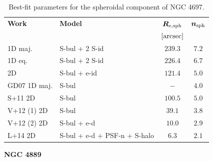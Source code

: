 \documentclass[preprint2]{emulateapj}
\begin{document}
  \begin{table}[h]
  \small
  \caption{Best-fit parameters for the spheroidal component of NGC 4697.}
  \begin{center}
  \begin{tabular}{llcc}
  \hline
  {\bf Work} & {\bf Model}   & $\bm R_{\rm e,sph}$    & $\bm n_{\rm sph}$ \\
    &  &  $[\rm arcsec]$ & \\
  \hline
  1D maj. & S-bul + 2 S-id & $239.3$  &  $7.2$ \\
  1D eq.  & S-bul + 2 S-id & $226.4$  &  $6.7$ \\
  2D      & S-bul + e-id	& $121.4$  &  $5.0$ \\
  \hline
  GD07 1D maj.  & S-bul & $-$  &  $4.0$ \\
  S+11 2D  & S-bul & $100.5$  &  $5.0$ \\
  V+12 (1) 2D  & S-bul & $39.1$  &  $3.8$ \\
  V+12 (2) 2D  & S-bul + e-d & $10.0$  &  $2.9$ \\
  L+14 2D  & S-bul + e-d + PSF-n + S-halo & $6.3$  &  $2.1$ \\
  \hline
  \end{tabular}
  \end{center}
  \label{tab:n4697}
  \end{table}

  \clearpage\newpage\noindent
  {\bf NGC 4889 \\}
\end{document}
